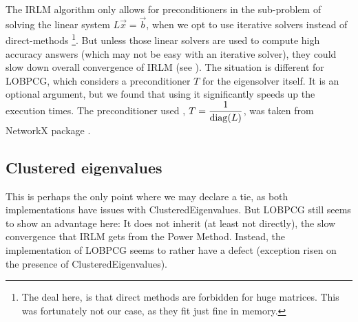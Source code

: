 The \gls{IRLM} algorithm only allows for preconditioners in the
sub-problem of solving the linear system $L\vec{x} = \vec{b}$, when we
opt to use iterative solvers instead of direct-methods \footnote{The deal
  here, is that direct methods are forbidden for huge matrices. This was
  fortunately not our case, as they fit just fine in memory.}. But
unless those linear solvers are used to compute high accuracy
answers (which may not be easy with an iterative solver), they could
slow down overall  convergence of \gls{IRLM} (see \cite{knyazev03}). The
situation is different for \gls{LOBPCG}, which considers a preconditioner $T$ for
the eigensolver itself. It is an optional argument, but we found that using
it significantly speeds up the execution times. The preconditioner
used , $T = \dfrac{1}{\operatorname{diag}(L)} $, was taken from NetworkX
package \cite{networkx}.

\subsection{Clustered eigenvalues}

This is perhaps the only point where we may declare a tie, as both
implementations have issues with \gls{ClusteredEigenvalues}. But
\gls{LOBPCG} still seems to show an advantage here: It does not
inherit (at least not directly), the slow convergence that \gls{IRLM}
gets from the Power Method. Instead, the implementation of
\gls{LOBPCG} seems to rather have a defect (exception risen on the
presence of \gls{ClusteredEigenvalues}).


